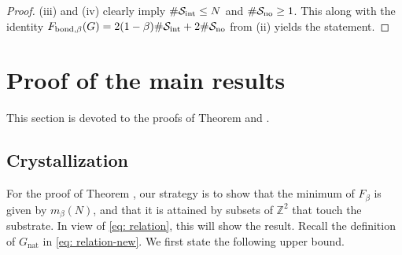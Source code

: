 \documentclass[reqno]{amsart}
\theoremstyle{plain}
\theoremstyle{definition}
\numberwithin{equation}{section}
\newcommand{\Z}{\mathbb{Z}}
\begin{document}
\begin{proof}
 (iii) and (iv) clearly imply $\#\mathcal{S}_{\rm int} \le N$ and $\#\mathcal{S}_{\rm no} \ge 1$.  This along with the identity  $F_{\mathrm{bond},\beta} (G)  =  2(1-\beta) \#\mathcal{S}_{\rm int} + 2\#\mathcal{S}_{\rm no}$  from  (ii) yields the statement. 
\end{proof} 


\section{Proof of the main results}\label{sec: main}


 This section is devoted to the proofs of Theorem   and .
 
 
\subsection{Crystallization}  \label{sec:thm:crystallization}
 For the proof of Theorem  , our strategy is to  show that the minimum of $F_\beta$ is given by $m_\beta(N)$, and that it is attained by subsets of $\Z^2$ that touch the substrate. In view of \eqref{eq: relation}, this will show the result.  Recall the definition of $G_{\mathrm{nat}}$ in \eqref{eq: relation-new}.  We first state the following upper bound.   
\end{document}
